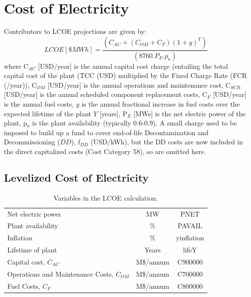 
\newpage

\section{Cost of Electricity} 


 Contributors to LCOE projections are given by: 
 \begin{equation} 
 LCOE [\$ MWh] = \frac{(C_{AC} + (C_{OM} + C_{F})(1+y)^Y)}{(8760.P_E.p_a)} 
 \label{eq:coe}
\end{equation} 
where C$_{AC}$ [USD/year] is the annual capital cost charge (entailing the total capital cost of the plant (TCC (USD) multiplied by the Fixed Charge Rate (FCR (/year)), C$_{OM}$ [USD/year] is the annual operations and maintenance cost, C$_{SCR}$ [USD/year] is the annual scheduled component replacement costs, C$_{F}$ [USD/year] is the annual fuel costs, $y$ is the annual fractional increase in fuel costs over the expected lifetime of the plant $Y$ [years], P$_{E}$ [MWe] is the net electric power of the plant, p$_{a}$ is the plant availability (typically 0.6-0.9).  A small charge used to be imposed to build up a fund to cover end-of-life Decontamination and Decommissioning ($DD$), f$_{DD}$ (USD/kWh), but the DD costs are now included in the direct capitalized costs (Cost Category 58), so are omitted here.





\subsection{Levelized Cost of Electricity} 

\begin{table}[h!] 
\begin{tabular}{l c c } 
Net electric power & MW & PNET \\
Plant availability & \% & PAVAIL \\
Inflation & \% & yinflation \\
Lifetime of plant & Years & lifeY \\
Capital cost, $C_{AC}$ &     M\$/annum    &    C900000      \\ 
Operations and Maintenance Costs, $C_{OM}$ & M\$/annum  &      C700000 \\ 
Fuel Costs, $C_{F}$ & M\$/annum  &       C800000 \\ 
    \end{tabular} 
    \caption{Variables in the LCOE calculation.}
    \label{tab:lcoe} 
\end{table} 

